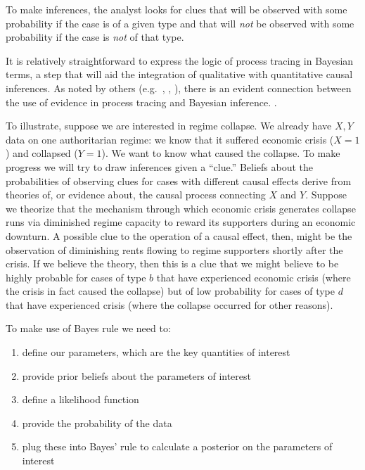 \documentclass[
  12pt,
]{book}
\providecommand{\tightlist}{%
  \setlength{\itemsep}{0pt}\setlength{\parskip}{0pt}}
\begin{document}
To make inferences, the analyst looks for clues that will be observed with some probability if the case is of a given type and that will \emph{not} be observed with some probability if the case is \emph{not} of that type.

It is relatively straightforward to express the logic of process tracing in Bayesian terms, a step that will aid the integration of qualitative with quantitative causal inferences. As noted by others (e.g.~\citet{BennettBayes}, \citet{beachpedersen2013process}, \citet{rohlfing2012case}), there is an evident connection between the use of evidence in process tracing and Bayesian inference. .

To illustrate, suppose we are interested in regime collapse. We already have \(X,Y\) data on one authoritarian regime: we know that it suffered economic crisis (\(X=1\)) and collapsed (\(Y=1\)). We want to know what caused the collapse. To make progress we will try to draw inferences given a ``clue.'' Beliefs about the probabilities of observing clues for cases with different causal effects derive from theories of, or evidence about, the causal process connecting \(X\) and \(Y\). Suppose we theorize that the mechanism through which economic crisis generates collapse runs via diminished regime capacity to reward its supporters during an economic downturn. A possible clue to the operation of a causal effect, then, might be the observation of diminishing rents flowing to regime supporters shortly after the crisis. If we believe the theory, then this is a clue that we might believe to be highly probable for cases of type \(b\) that have experienced economic crisis (where the crisis in fact caused the collapse) but of low probability for cases of type \(d\) that have experienced crisis (where the collapse occurred for other reasons).

To make use of Bayes rule we need to:

\begin{enumerate}
\def\labelenumi{\arabic{enumi}.}
\tightlist
\item
  define our parameters, which are the key quantities of interest
\item
  provide prior beliefs about the parameters of interest
\item
  define a likelihood function
\item
  provide the probability of the data
\item
  plug these into Bayes' rule to calculate a posterior on the parameters of interest
\end{enumerate}
\end{document}
